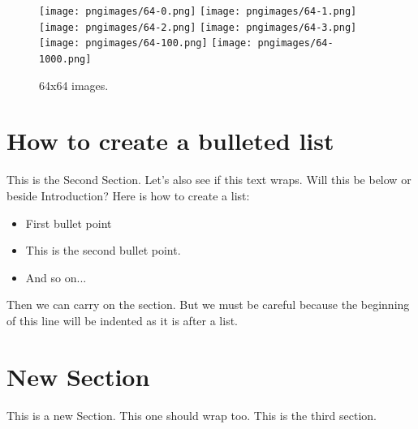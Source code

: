 \documentclass{article}
\begin{document}
\begin{figure}[H]
\centering
\texttt{[image: pngimages/64-0.png]}
\texttt{[image: pngimages/64-1.png]}
\texttt{[image: pngimages/64-2.png]}
\texttt{[image: pngimages/64-3.png]}
\texttt{[image: pngimages/64-100.png]}
\texttt{[image: pngimages/64-1000.png]}
\caption{64x64 images.}
\end{figure}



\section{How to create a bulleted list}
This is the Second Section. Let's also see if this text wraps. Will this be below or beside Introduction? Here is how to create a list:

\begin{itemize}
\item First bullet point
\item This is the second bullet point.
\item And so on...
\end{itemize}

Then we can carry on the section. But we must be careful because the beginning of this line will be indented as it is after a list.


\section{New Section}
This is a new Section. This one should wrap too. This is the third section.


\end{document}

